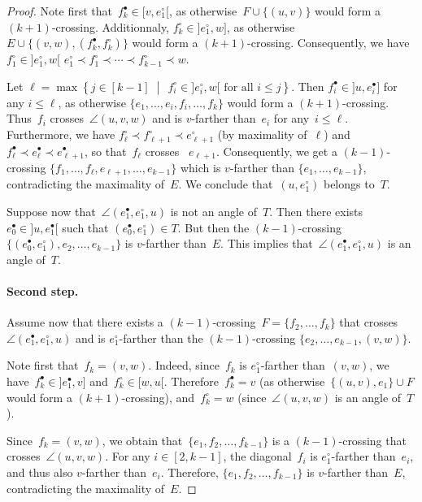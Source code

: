 \documentclass{amsart}
\theoremstyle{remark}
\newcommand{\cl}{\prec}
\newcommand{\set}[2]{\left\{ #1 \;\middle|\; #2 \right\}} %
\begin{document}
\begin{proof}
Note first that~$f^\bullet_k \in [v, e^\circ_1[$, as otherwise~$F \cup \{(u, v)\}$ would form a $(k + 1)$-crossing.
Additionnaly, $f^\circ_k \in {]e^\circ_1, w]}$, as otherwise $E \cup \{(v,w), (f^\bullet_k, f^\circ_k)\}$ would form a $(k + 1)$-crossing. 
Consequently, we have~$f^\circ_1 \in {]e^\circ_1, w[}$ $e^\circ_1 \cl f^\circ_1 \cl \cdots \cl f^\circ_{k-1} \cl w$.

Let $\ell = \max \set{j\in[k-1]}{\, f^\circ_i \in {]e^\circ_i, w[} \text{ for all } i \le j}$.
Then $f^\bullet_i \in {]u, e^\bullet_i]}$ for any $i \le \ell$, as otherwise $\{e_1, \dots , e_i, f_i, \dots , f_k\}$ would form a $(k + 1)$-crossing.
Thus~$f_i$ crosses~$\angle(u,v,w)$ and is $v$-farther than~$e_i$ for any~$i \le \ell$.
Furthermore, we have $f^\circ_\ell \cl f^\circ_{\ell+1} \cl e^\circ_{\ell+1}$ (by maximality of~$\ell$) and~$f^\bullet_\ell \cl e^\bullet_{\ell} \cl e^\bullet_{\ell+1}$, so that~$f_\ell$ crosses~
$e_{\ell+1}$. 
Consequently, we get a $(k-1)$-crossing $\{f_1, \dots , f_\ell, e_{\ell+1}, \dots , e_{k-1}\}$ which is $v$-farther than $\{e_1, \dots , e_{k-1}\}$, contradicting the maximality of~$E$. 
We conclude that~$(u, e^\circ_1)$ belongs to~$T$.

Suppose now that~$\angle(e^\bullet_1, e^\circ_1, u)$ is not an angle of~$T$. 
Then there exists $e^\bullet_0 \in {]u, e^\bullet_1[}$ such that $(e^\bullet_0, e^\circ_1) \in T$. 
But then the $(k-1)$-crossing $\{(e^\bullet_0, e^\circ_1), e_2, \dots, e_{k-1}\}$ is $v$-farther than~$E$. 
This implies that~$\angle(e^\bullet_1, e^\circ_1, u)$ is an angle of~$T$.

\medskip
\paragraph{\bf Second step.}
Assume now that there exists a $(k-1)$-crossing~$F=\{f_2, \dots , f_k\}$ that crosses $\angle(e^\bullet_1, e^\circ_1, u)$ and is $e^\circ_1$-farther than the $(k-1)$-crossing $\{e_2, \dots, e_{k-1}, (v, w)\}$.

Note first that~$f_k = (v,w)$. Indeed, since~$f_k$ is $e^\circ_1$-farther than~$(v,w)$, we have~$f^\bullet_k \in {]e^\bullet_1, v]}$ and~$f^\circ_k \in [w,u[$. Therefore~$f^\bullet_k = v$ (as otherwise~$\{(u,v), e_1\} \cup F$ would form a $(k+1)$-crossing), and~$f^\circ_k = w$ (since~$\angle(u,v,w)$ is an angle of~$T$).

Since~$f_k = (v,w)$, we obtain that~$\{e_1, f_2, \dots, f_{k-1}\}$ is a $(k-1)$-crossing that crosses~$\angle(u,v,w)$. For any $i \in [2,k-1]$, the diagonal~$f_i$ is $e^\circ_1$-farther than~$e_i$, and thus also $v$-farther than~$e_i$. Therefore, $\{e_1, f_2, \dots, f_{k-1}\}$ is $v$-farther than~$E$, contradicting the maximality of~$E$.
\end{proof}
\end{document}
